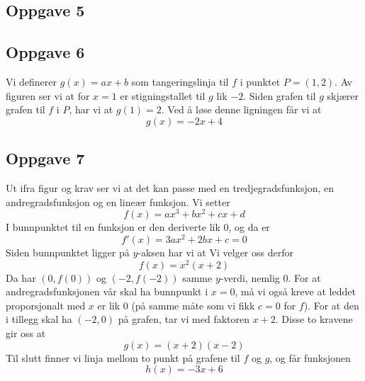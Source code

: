 \newpage
\subsection*{Oppgave 5}

\newpage
\subsection*{Oppgave 6}
Vi definerer $ g(x)=ax+b $ som tangeringslinja til $ f $ i punktet $ P=(1, 2) $. Av figuren ser vi at for $ x=1 $ er stigningstallet til $ g $ lik $ -2 $. Siden grafen til $ g $ skjærer grafen til $ f $ i $ P $, har vi at $ g(1)=2 $. Ved å løse denne ligningen får vi at
\[ g(x)=-2x+4 \] 

\subsection*{Oppgave 7}
Ut ifra figur og krav ser vi at det kan passe med en tredjegradsfunksjon, en andregradsfunksjon og en lineær funksjon. Vi setter
\[ f(x)=ax^3+bx^2+cx+d \]
I bunnpunktet til en funksjon er den deriverte lik 0, og da er
\[ f'(x)=3ax^2+2bx+c=0 \]
Siden bunnpunktet ligger på $ y $-aksen har vi at
Vi velger oss derfor
\[ f(x)=x^2(x+2) \]
Da har $ (0, f(0)) $ og $ (-2, f(-2)) $ samme $ y $-verdi, nemlig 0. For at andregradsfunksjonen vår skal ha bunnpunkt i $ x=0 $, må vi også kreve at leddet proporsjonalt med $ x $ er lik 0 (på samme måte som vi fikk $ c=0 $ for $ f $). For at den i tillegg skal ha $ (-2, 0) $ på grafen, tar vi med faktoren $ x+2 $. Disse to kravene gir oss at 
\[ g(x)=(x+2)(x-2) \]
\newpage
Til slutt finner vi linja mellom to punkt på grafene til $ f $ og $ g $, og får funksjonen
\[ h(x)=-3x+6 \]
